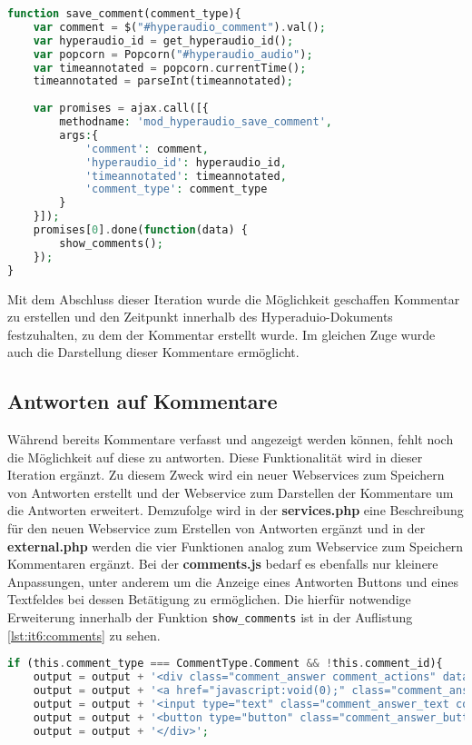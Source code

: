 \begin{lstlisting}[language=php,
             linewidth=\textwidth,
             caption={Ausschnitt der \textbf{comments.js} in der 5. Iteration},
             label={lst:it5:comments}]
function save_comment(comment_type){
	var comment = $("#hyperaudio_comment").val();
	var hyperaudio_id = get_hyperaudio_id();
	var popcorn = Popcorn("#hyperaudio_audio");
	var timeannotated = popcorn.currentTime();
	timeannotated = parseInt(timeannotated);
	    
	var promises = ajax.call([{
		methodname: 'mod_hyperaudio_save_comment',
		args:{
			'comment': comment,
			'hyperaudio_id': hyperaudio_id,       
			'timeannotated': timeannotated,
			'comment_type': comment_type
		}
	}]);
	promises[0].done(function(data) {
		show_comments();
	});
}
\end{lstlisting}

Mit dem Abschluss dieser Iteration wurde die Möglichkeit geschaffen Kommentar zu erstellen und den Zeitpunkt innerhalb des Hyperaduio-Dokuments festzuhalten, zu dem der Kommentar erstellt wurde. Im gleichen Zuge wurde auch die Darstellung dieser Kommentare ermöglicht.

\subsection{Antworten auf Kommentare}
Während bereits Kommentare verfasst und angezeigt werden können, fehlt noch die Möglichkeit auf diese zu antworten. Diese Funktionalität wird in dieser Iteration ergänzt. Zu diesem Zweck wird ein neuer Webservices zum Speichern von Antworten erstellt und der Webservice zum Darstellen der Kommentare um die Antworten erweitert. Demzufolge wird in der \textbf{services.php} eine Beschreibung für den neuen Webservice zum Erstellen von Antworten ergänzt und in der \textbf{external.php} werden die vier Funktionen analog zum Webservice zum Speichern Kommentaren ergänzt. Bei der \textbf{comments.js} bedarf es ebenfalls nur kleinere Anpassungen, unter anderem um die Anzeige eines Antworten Buttons und eines Textfeldes bei dessen Betätigung zu ermöglichen. Die hierfür notwendige Erweiterung innerhalb der Funktion \texttt{show_comments} ist in der Auflistung \ref{lst:it6:comments} zu sehen.

\begin{lstlisting}[language=php,
             linewidth=\textwidth,
             caption={Ausschnitt der \textbf{comments.js} in der 6. Iteration},
             label={lst:it6:comments}]
if (this.comment_type === CommentType.Comment && !this.comment_id){
	output = output + '<div class="comment_answer comment_actions" data-comment_id="'+this.id+'">';
	output = output + '<a href="javascript:void(0);" class="comment_answer_link comment_link" onclick="show_answer_input(this)" data-comment_id="'+this.id+'">' + string_answer + '</a>';
	output = output + '<input type="text" class="comment_answer_text comment_hidden_element" data-comment_id="'+this.id+'"/>';
	output = output + '<button type="button" class="comment_answer_button comment_hidden_element" data-comment_id="'+this.id+'">' + string_answer + '</button>';
	output = output + '</div>';
\end{lstlisting}

